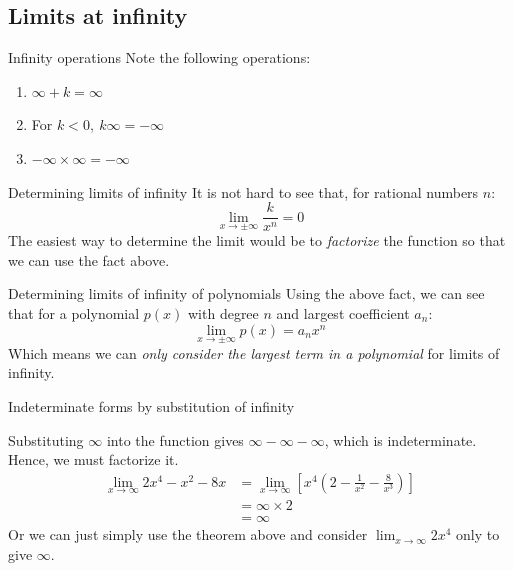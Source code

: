 \documentclass{article}
\begin{document}
\subsection{Limits at infinity}
\begin{theorem}
    {Infinity operations}
    Note the following operations:
    \begin{enumerate}
        \item $\infty + k=\infty$
        \item For $k<0,\ k\infty=-\infty$
        \item $-\infty\times\infty=-\infty$
    \end{enumerate}
\end{theorem}
\begin{knBox}
    {Determining limits of infinity}
    It is not hard to see that, for rational numbers $n$:
    \[\lim_{x\to\pm\infty}\frac{k}{x^n}=0\]
    The easiest way to determine the limit would be to \emph{factorize} the function so that we can use the fact above.
\end{knBox}
\begin{theorem}
    {Determining limits of infinity of polynomials}
    Using the above fact, we can see that for a polynomial $p(x)$ with degree $n$ and largest coefficient $a_n$:
    \[\lim_{x\to\pm\infty}p(x)=a_nx^n\]
    Which means we can \emph{only consider the largest term in a polynomial} for limits of infinity.
\end{theorem}
\begin{example}
    Indeterminate forms by substitution of infinity

    Substituting $\infty$ into the function gives $\infty-\infty-\infty$, which is indeterminate. Hence, we must factorize it.
    \begin{align*}
        \lim_{x\to\infty}2x^4-x^2-8x & =\lim_{x\to\infty}[x^4(2-\frac{1}{x^2}-\frac{8}{x^3})] \\
                                     & =\infty\times 2                                        \\
                                     & =\infty
    \end{align*}
    Or we can just simply use the theorem above and consider $\lim_{x\to\infty}2x^4$ only to give $\infty$.
\end{example}
\end{document}

